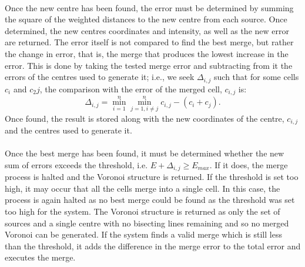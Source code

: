 \\
Once the new centre has been found, the error must be determined by summing the square of the weighted distances to the new centre from each source. Once determined, the new centres coordinates and intensity, as well as the new error are returned. The error itself is not compared to find the best merge, but rather the change in error, that is, the merge that produces the lowest increase in the error. This is done by taking the tested merge error and subtracting from it the errors of the centres used to generate it; i.e., we seek $\Delta_{i,j}$ such that for some cells $c_i$ and $c_2j$, the comparison with the error of the merged cell, $c_{i,j}$ is:
\begin{equation}
	\Delta_{i,j} = \min^n_{i = 1}\min^n_{j = 1, i \neq j}c_{i,j} - (c_i + c_j).
\end{equation}
Once found, the result is stored along with the new coordinates of the centre, $c_{i,j}$ and the centres used to generate it.
\\
\\
Once the best merge has been found, it must be determined whether the new sum of errors exceeds the threshold, i.e. $E + \Delta_{i,j} \geq E_{max}$. If it does, the merge process is halted and the Voronoi structure is returned. If the threshold is set too high, it may occur that all the cells merge into a single cell. In this case, the process is again halted as no best merge could be found as the threshold was set too high for the system. The Voronoi structure is returned as only the set of sources and a single centre with no bisecting lines remaining and so no merged Voronoi can be generated. If the system finds a valid merge which is still less than the threshold, it adds the difference in the merge error to the total error and executes the merge.

